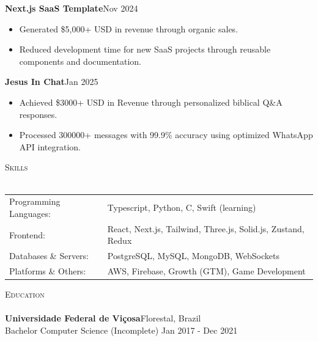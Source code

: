 \documentclass[a4paper]{article}
\newcommand{\lineunder}{
    \vspace*{-8pt} \\
    \hspace*{-18pt} \hrulefill \\
}
\newcommand{\header}[1]{
    {\hspace*{-18pt}\vspace*{6pt} \textsc{#1}}
    \vspace*{-6pt} \lineunder
}
\begin{document}
    \textbf{Next.js SaaS Template}\hfill  Nov 2024\\
    \vspace{-3mm}
    \begin{itemize} \itemsep -3pt
        \item Generated \$5,000+ USD in revenue through organic sales.
        \item Reduced development time for new SaaS projects through reusable components and documentation.
    \end{itemize}

    \textbf{Jesus In Chat}\hfill  Jan 2025\\
    \vspace{-3mm}
    \begin{itemize} \itemsep -3pt
        \item Achieved \$3000+ USD in Revenue through personalized biblical Q\&A responses.
        \item Processed 300000+ messages with 99.9\% accuracy using optimized WhatsApp API integration.
    \end{itemize}
    \vspace{1mm}

    \header{Skills}
    \vspace{2mm}
    \begin{longtable}{p{4cm}p{12cm}}
        Programming Languages: & Typescript, Python, C, Swift (learning) \\
        Frontend: & React, Next.js, Tailwind, Three.js, Solid.js, Zustand, Redux \\
        Databases \& Servers: & PostgreSQL, MySQL, MongoDB, WebSockets \\
        Platforms \& Others: & AWS, Firebase, Growth (GTM), Game Development \\
    \end{longtable}
    \vspace{1mm}

    \header{Education}
    \vspace{2mm}
    \textbf{Universidade Federal de Viçosa}\hfill Florestal, Brazil\\
    Bachelor Computer Science (Incomplete) \hfill Jan 2017 - Dec 2021\\
\end{document}
